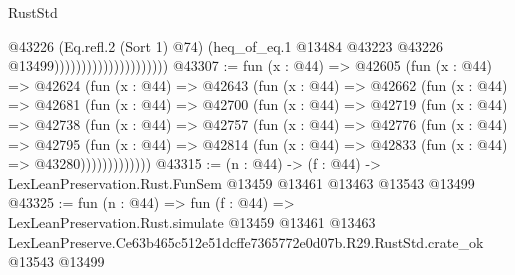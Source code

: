\begin{lexlean}{RustStd}
\begin{coremodule}
                                            @43226
                                            (Eq.refl.{2} (Sort 1) @74)
                                            (heq_of_eq.{1}
                                              @13484
                                              @43223
                                              @43226
                                              @13499)))))))))))))))))))))
@43307 := fun (x : @44) =>
  @42605
    (fun (x : @44) =>
    @42624
      (fun (x : @44) =>
      @42643
        (fun (x : @44) =>
        @42662
          (fun (x : @44) =>
          @42681
            (fun (x : @44) =>
            @42700
              (fun (x : @44) =>
              @42719
                (fun (x : @44) =>
                @42738
                  (fun (x : @44) =>
                  @42757
                    (fun (x : @44) =>
                    @42776
                      (fun (x : @44) =>
                      @42795
                        (fun (x : @44) =>
                        @42814 (fun (x : @44) => @42833 (fun (x : @44) => @43280)))))))))))))
@43315 := (n : @44) ->
  (f : @44) -> LexLeanPreservation.Rust.FunSem @13459 @13461 @13463 @13543 @13499
@43325 := fun (n : @44) =>
  fun (f : @44) =>
  LexLeanPreservation.Rust.simulate
    @13459
    @13461
    @13463
    LexLeanPreserve.Ce63b465c512e51dcffe7365772e0d07b.R29.RustStd.crate_ok
    @13543
    @13499
\end{coremodule}
\end{lexlean}
